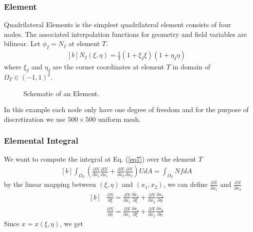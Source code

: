 \documentclass[]{article}
\begin{document}
\subsubsection{Element} \label{sec: elem}
Quadrilateral Elements is the simplest quadrilateral element consists of
four nodes. The associated interpolation functions for geometry and ﬁeld
variables are bilinear. Let $\phi_{I}=N_I $ at element $T$.
\begin{equation}\label{eq11}
	\begin{aligned}[b]
		N_{I}(\xi, \eta) = \frac{1}{4}(1+\xi_I\xi)(1+\eta_I\eta)
	\end{aligned}
\end{equation}
where $\xi_{I}$ and $\eta_{I}$ are the corner coordinates at element $T$ in domain of $\Omega_{T} \in (-1,1)^2$.

\begin{figure}[htbp]
	\centering
	
	\caption{Schematic of an Element.}
	\label{fig_el}
\end{figure}
%
In this example each node only have one degree of freedom and for the purpose of discretization we use $500 \times 500$ uniform mesh.
\subsubsection{Elemental Integral} \label{sec: elem int}
  We want to compute the integral at Eq. (\ref{eq7}) over the element $T$
\begin{equation}\label{eq12}
	\begin{aligned}[b]
		\int_{\Omega_{T}} (\frac{\partial N}{\partial x_{1}}
		\frac{\partial N}{\partial x_{1}}+\frac{\partial N}{\partial x_{2}} 
		\frac{\partial N}{\partial x_{2}})U dA = \int_{\Omega_{T}} Nf dA
	\end{aligned}
\end{equation}
by the linear mapping between $(\xi,\eta)$ and $(x_{1},x_2)$, we can define $\frac{\partial N}{\partial x_{1}}$ and $\frac{\partial N}{\partial x_{2}}$
\begin{equation}\label{eq13}
	\begin{aligned}[b]
&
		\frac{\partial N}{\partial \xi} = \frac{\partial N}{\partial x_{1}}\frac{\partial x_{1}}{\partial \xi}+\frac{\partial N}{\partial x_{2}}\frac{\partial x_{2}}{\partial \eta}\\
& 
		\frac{\partial N}{\partial \eta} = \frac{\partial N}{\partial x_{1}}\frac{\partial x_{1}}{\partial \xi}+\frac{\partial N}{\partial x_{2}}\frac{\partial x_{2}}{\partial \eta}
	\end{aligned}
\end{equation}
Since $x=x(\xi,\eta)$, we get
\end{document}
